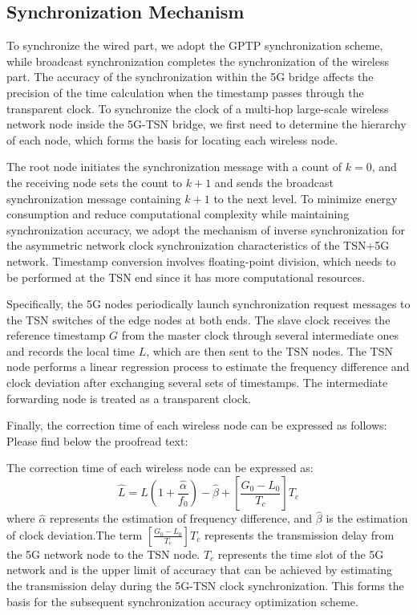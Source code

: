 \documentclass[english]{cccconf}
\begin{document}
{\subsection{Synchronization Mechanism}
To synchronize the wired part, we adopt the GPTP synchronization scheme, while broadcast synchronization completes the synchronization of the wireless part. The accuracy of the synchronization within the 5G bridge affects the precision of the time calculation when the timestamp passes through the transparent clock. To synchronize the clock of a multi-hop large-scale wireless network node inside the 5G-TSN bridge, we first need to determine the hierarchy of each node, which forms the basis for locating each wireless node.

The root node initiates the synchronization message with a count of $k=0$, and the receiving node sets the count to $k+1$ and sends the broadcast synchronization message containing $k+1$ to the next level. To minimize energy consumption and reduce computational complexity while maintaining synchronization accuracy, we adopt the mechanism of inverse synchronization for the asymmetric network clock synchronization characteristics of the TSN+5G network\cite{8935413}. Timestamp conversion involves floating-point division, which needs to be performed at the TSN end since it has more computational resources.

Specifically, the 5G nodes periodically launch synchronization request messages to the TSN switches of the edge nodes at both ends. The slave clock receives the reference timestamp $G$ from the master clock through several intermediate ones and records the local time $L$, which are then sent to the TSN nodes. The TSN node performs a linear regression process to estimate the frequency difference and clock deviation after exchanging several sets of timestamps. The intermediate forwarding node is treated as a transparent clock.

Finally, the correction time of each wireless node can be expressed as follows:
Please find below the proofread text:

The correction time of each wireless node can be expressed as:
\begin{equation}
	\widehat{L}=L\left(1+\frac{\widehat{\alpha}}{f_0}\right)-\widehat{\beta}+\left[\frac{G_0-L_0}{T_c}\right] T_c
\end{equation}
where $\widehat{\alpha}$ represents the estimation of frequency difference, and $\widehat{\beta}$ is the estimation of clock deviation.The term $[\frac{G_0-L_0}{T_c}] T_c$ represents the transmission delay from the 5G network node to the TSN node. $T_c$ represents the time slot of the 5G network and is the upper limit of accuracy that can be achieved by estimating the transmission delay during the 5G-TSN clock synchronization. This forms the basis for the subsequent synchronization accuracy optimization scheme.
}
\end{document}
